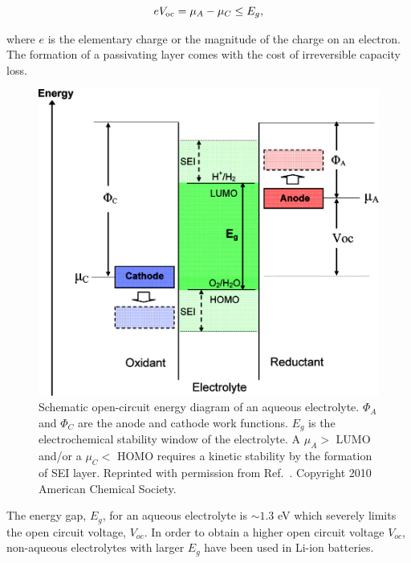 \documentclass[../main.tex]{subfiles}
\begin{document}
\begin{equation}
    eV_{\rm oc}=\mu_{A}-\mu_{C}\leq E_{g},
\end{equation}

where $e$ is the elementary charge or the magnitude of the charge on an electron. %
The formation of a passivating layer comes with the cost of irreversible capacity loss.

\begin{figure}
    \centering
    \includegraphics{figures/electrolyte.jpeg}
    \caption{Schematic open-circuit energy diagram of an aqueous electrolyte. $\Phi_{A}$ and $\Phi_{C}$ are the anode and cathode work functions. $E_{g}$ is the electrochemical stability window of the electrolyte. A $\mu_{A}>$ LUMO and/or a $\mu_{C}<$ HOMO requires a kinetic stability by the formation of SEI layer. Reprinted with permission from Ref.~. Copyright 2010 American Chemical Society.}
    \label{fig:electrolyte}
\end{figure}

The energy gap, $E_g$, for an aqueous electrolyte is $\sim 1.3$ eV which severely limits the open circuit voltage, $V_{oc}$. In order to obtain a higher open circuit voltage $V_{oc}$, non-aqueous electrolytes with larger $E_g$ have been used in Li-ion batteries.\cite{Xu2004} 
\end{document}
